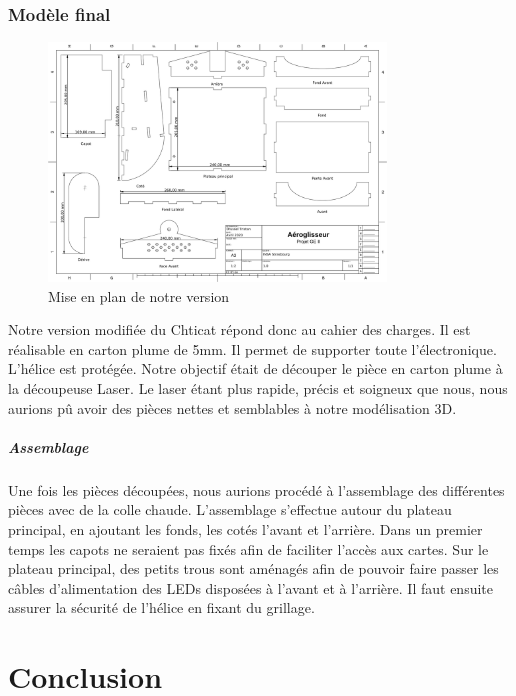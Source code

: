 \documentclass[a4paper,12pt]{book}
\begin{document}
			\subsection{Modèle final}
				\begin{figure}[h]
					\begin{center}
						 \includegraphics[width=0.8\textwidth]{../Illus/MiseEnPlanModif}
					\end{center}
					\caption{Mise en plan de notre version}
					\label{MEP}
				\end{figure}
				Notre version modifiée du Chticat répond donc au cahier des charges. Il est réalisable en carton plume de 5mm. Il permet de supporter toute l'électronique. L'hélice est protégée. 
				Notre objectif était de découper le pièce en carton plume à la découpeuse Laser. Le laser étant plus rapide, précis et soigneux que nous, nous aurions pû avoir des pièces nettes et semblables à notre modélisation 3D.
				\paragraph{Assemblage} Une fois les pièces découpées, nous aurions procédé à l'assemblage des différentes pièces avec de la colle chaude. L'assemblage s'effectue autour du plateau principal, en ajoutant les fonds, les cotés l'avant et l'arrière. Dans un premier temps les capots ne seraient pas fixés afin de faciliter l'accès aux cartes. Sur le plateau principal, des petits trous sont aménagés afin de pouvoir faire passer les câbles d'alimentation des LEDs disposées à l'avant et à l'arrière. Il faut ensuite assurer la sécurité de l'hélice en fixant du grillage.
	\chapter{Conclusion}
	
\end{document}
